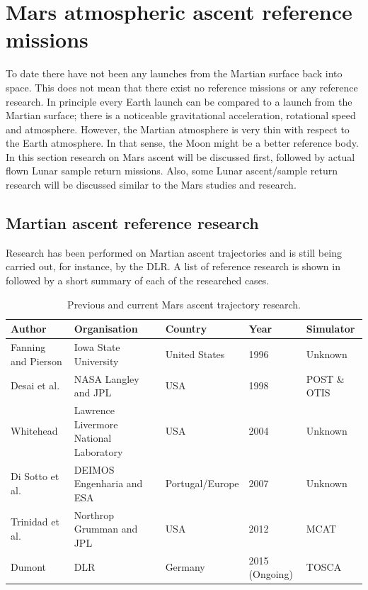 \section{Mars atmospheric ascent reference missions}
\label{sec:maratascref}
To date there have not been any launches from the Martian surface back into space. This does not mean that there exist no reference missions or any reference research. In principle every Earth launch can be compared to a launch from the Martian surface; there is a noticeable gravitational acceleration, rotational speed and atmosphere. However, the Martian atmosphere is very thin with respect to the Earth atmosphere. In that sense, the Moon might be a better reference body. In this section research on Mars ascent will be discussed first, followed by actual flown Lunar sample return missions. Also, some Lunar ascent/sample return research will be discussed similar to the Mars studies and research.
%

\subsection{Martian ascent reference research}
\label{subsec:mars_res}
Research has been performed on Martian ascent trajectories and is still being carried out, for instance, by the \ac{DLR}. A list of reference research is shown in  followed by a short summary of each of the researched cases.

\begin{table}[!ht]
\begin{center}
\caption{Previous and current Mars ascent trajectory research.}
\label{tab:marsascent_refres}
\begin{tabular}{|p{3cm}|p{3cm}|p{3cm}|l|l|}
\hline 
\textbf{Author} 	& \textbf{Organisation} & \textbf{Country} & \textbf{Year} & \textbf{Simulator} \\ \hline \hline
Fanning and Pierson \cite{fanning1996model} & Iowa State University & United States & 1996 & Unknown\\ \hline
Desai et al. \cite{desai1998}& NASA Langley and \ac{JPL} & USA & 1998 & \acs{POST} \& \acs{OTIS} \\ \hline
Whitehead \cite{whitehead2004mars,whitehead2005} & Lawrence Livermore National Laboratory & USA & 2004 & Unknown\\ \hline
Di Sotto et al. \cite{di2007system} & DEIMOS Engenharia and \acs{ESA} & Portugal/Europe & 2007 & Unknown\\ \hline
Trinidad et al. \cite{trinidad2012} & Northrop Grumman and \ac{JPL} & USA & 2012 & MCAT \\ \hline
Dumont \cite{dumont2015design}& \ac{DLR} 		& Germany & 2015 (Ongoing) & \acs{TOSCA} \\ \hline

\end{tabular}
\end{center}
\end{table}

